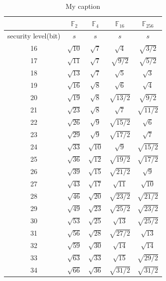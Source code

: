 \begin{table}[]
\centering
\caption{My caption}
\label{my-label}
\begin{tabular}{|c|c|c|c|c|}
\hline
                    & $\mathbb{F}_2$           & $\mathbb{F}_4$           & $\mathbb{F}_{16}$          & $\mathbb{F}_{256}$         \\ \hline
security level(bit) & \multicolumn{1}{c|}{$s$} & \multicolumn{1}{c|}{$s$} & \multicolumn{1}{c|}{$s$} & \multicolumn{1}{c|}{$s$} \\ \hline
16 &$\sqrt{ 10 }$&$\sqrt{ 7 }$&$\sqrt{ 4 }$&$\sqrt{ 3/2 }$\\ \hline
17 &$\sqrt{ 11 }$&$\sqrt{ 7 }$&$\sqrt{ 9/2 }$&$\sqrt{ 5/2 }$\\ \hline
18 &$\sqrt{ 13 }$&$\sqrt{ 7 }$&$\sqrt{ 5 }$&$\sqrt{ 3 }$\\ \hline
19 &$\sqrt{ 16 }$&$\sqrt{ 8 }$&$\sqrt{ 6 }$&$\sqrt{ 4 }$\\ \hline
20 &$\sqrt{ 19 }$&$\sqrt{ 8 }$&$\sqrt{ 13/2 }$&$\sqrt{ 9/2 }$\\ \hline
21 &$\sqrt{ 23 }$&$\sqrt{ 8 }$&$\sqrt{ 7 }$&$\sqrt{ 11/2 }$\\ \hline
22 &$\sqrt{ 26 }$&$\sqrt{ 9 }$&$\sqrt{ 15/2 }$&$\sqrt{ 6 }$\\ \hline
23 &$\sqrt{ 29 }$&$\sqrt{ 9 }$&$\sqrt{ 17/2 }$&$\sqrt{ 7 }$\\ \hline
24 &$\sqrt{ 33 }$&$\sqrt{ 10 }$&$\sqrt{ 9 }$&$\sqrt{ 15/2 }$\\ \hline
25 &$\sqrt{ 36 }$&$\sqrt{ 12 }$&$\sqrt{ 19/2 }$&$\sqrt{ 17/2 }$\\ \hline
26 &$\sqrt{ 39 }$&$\sqrt{ 15 }$&$\sqrt{ 21/2 }$&$\sqrt{ 9 }$\\ \hline
27 &$\sqrt{ 43 }$&$\sqrt{ 17 }$&$\sqrt{ 11 }$&$\sqrt{ 10 }$\\ \hline
28 &$\sqrt{ 46 }$&$\sqrt{ 20 }$&$\sqrt{ 23/2 }$&$\sqrt{ 21/2 }$\\ \hline
29 &$\sqrt{ 49 }$&$\sqrt{ 23 }$&$\sqrt{ 25/2 }$&$\sqrt{ 23/2 }$\\ \hline
30 &$\sqrt{ 53 }$&$\sqrt{ 25 }$&$\sqrt{ 13 }$&$\sqrt{ 25/2 }$\\ \hline
31 &$\sqrt{ 56 }$&$\sqrt{ 28 }$&$\sqrt{ 27/2 }$&$\sqrt{ 13 }$\\ \hline
32 &$\sqrt{ 59 }$&$\sqrt{ 30 }$&$\sqrt{ 14 }$&$\sqrt{ 14 }$\\ \hline
33 &$\sqrt{ 63 }$&$\sqrt{ 33 }$&$\sqrt{ 15 }$&$\sqrt{ 29/2 }$\\ \hline
34 &$\sqrt{ 66 }$&$\sqrt{ 36 }$&$\sqrt{ 31/2 }$&$\sqrt{ 31/2 }$\\ \hline

\end{tabular}
\end{table}
